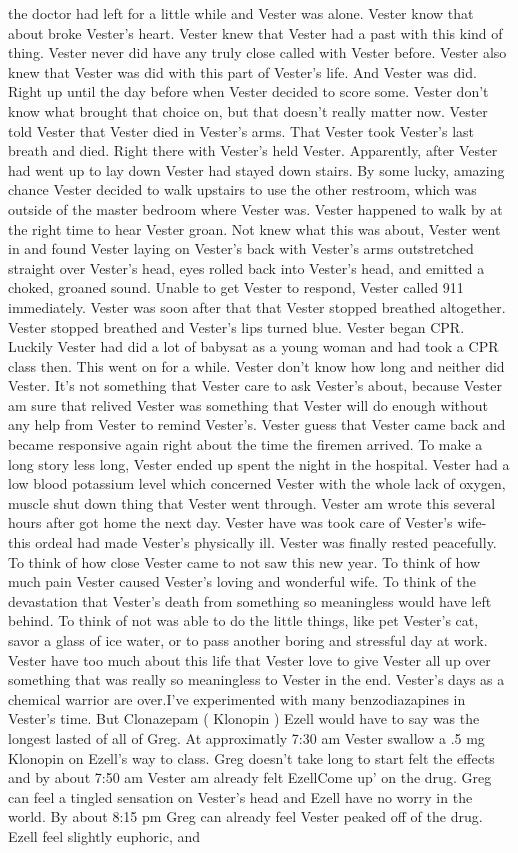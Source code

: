 \documentclass[12pt]{book}
\begin{document}
the doctor had left for a little while and Vester was alone. Vester know that about broke Vester's heart. Vester knew that Vester had a past with this kind of thing. Vester never did have any truly close called with Vester before. Vester also knew that Vester was did with this part of Vester's life. And Vester was did. Right up until the day before when Vester decided to score some. Vester don't know what brought that choice on, but that doesn't really matter now. Vester told Vester that Vester died in Vester's arms. That Vester took Vester's last breath and died. Right there with Vester's held Vester. Apparently, after Vester had went up to lay down Vester had stayed down stairs. By some lucky, amazing chance Vester decided to walk upstairs to use the other restroom, which was outside of the master bedroom where Vester was. Vester happened to walk by at the right time to hear Vester groan. Not knew what this was about, Vester went in and found Vester laying on Vester's back with Vester's arms outstretched straight over Vester's head, eyes rolled back into Vester's head, and emitted a choked, groaned sound. Unable to get Vester to respond, Vester called 911 immediately. Vester was soon after that that Vester stopped breathed altogether. Vester stopped breathed and Vester's lips turned blue. Vester began CPR. Luckily Vester had did a lot of babysat as a young woman and had took a CPR class then. This went on for a while. Vester don't know how long and neither did Vester. It's not something that Vester care to ask Vester's about, because Vester am sure that relived Vester was something that Vester will do enough without any help from Vester to remind Vester's. Vester guess that Vester came back and became responsive again right about the time the firemen arrived. To make a long story less long, Vester ended up spent the night in the hospital. Vester had a low blood potassium level which concerned Vester with the whole lack of oxygen, muscle shut down thing that Vester went through. Vester am wrote this several hours after got home the next day. Vester have was took care of Vester's wife- this ordeal had made Vester's physically ill. Vester was finally rested peacefully. To think of how close Vester came to not saw this new year. To think of how much pain Vester caused Vester's loving and wonderful wife. To think of the devastation that Vester's death from something so meaningless would have left behind. To think of not was able to do the little things, like pet Vester's cat, savor a glass of ice water, or to pass another boring and stressful day at work. Vester have too much about this life that Vester love to give Vester all up over something that was really so meaningless to Vester in the end. Vester's days as a chemical warrior are over.I've experimented with many benzodiazapines in Vester's time. But Clonazepam ( Klonopin ) Ezell would have to say was the longest lasted of all of Greg. At approximatly 7:30 am Vester swallow a .5 mg Klonopin on Ezell's way to class. Greg doesn't take long to start felt the effects and by about 7:50 am Vester am already felt EzellCome up' on the drug. Greg can feel a tingled sensation on Vester's head and Ezell have no worry in the world. By about 8:15 pm Greg can already feel Vester peaked off of the drug. Ezell feel slightly euphoric, and 
\end{document}
